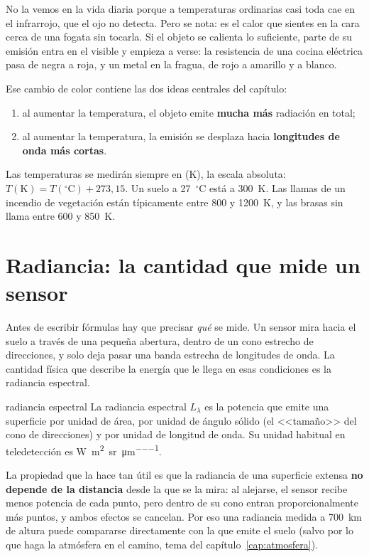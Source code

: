 No la vemos en la vida diaria porque a temperaturas ordinarias casi toda cae en el infrarrojo,
que el ojo no detecta. Pero se nota: es el calor que sientes en la cara cerca de una fogata sin
tocarla. Si el objeto se calienta lo suficiente, parte de su emisión entra en el visible y
empieza a verse: la resistencia de una cocina eléctrica pasa de negra a roja, y un metal en la
fragua, de rojo a amarillo y a blanco.

Ese cambio de color contiene las dos ideas centrales del capítulo:

\begin{enumerate}
  \item al aumentar la temperatura, el objeto emite \textbf{mucha más} radiación en total;
  \item al aumentar la temperatura, la emisión se desplaza hacia \textbf{longitudes de onda más
  cortas}.
\end{enumerate}

Las temperaturas se medirán siempre en  (K), la escala absoluta: $T(\mathrm{K})
= T(^\circ\mathrm{C}) + 273{,}15$. Un suelo a 27~$^\circ$C está a 300~K. Las llamas de un
incendio de vegetación están típicamente entre 800 y 1200~K, y las brasas sin llama entre 600 y
850~K.

\section{Radiancia: la cantidad que mide un sensor}

Antes de escribir fórmulas hay que precisar \emph{qué} se mide. Un sensor mira hacia el suelo a
través de una pequeña abertura, dentro de un cono estrecho de direcciones, y solo deja pasar una
banda estrecha de longitudes de onda. La cantidad física que describe la energía que le llega en
esas condiciones es la radiancia espectral.

\begin{definicion}{radiancia espectral}
La radiancia espectral $L_\lambda$ es la potencia que emite una superficie por unidad de área,
por unidad de ángulo sólido (el <<tamaño>> del cono de direcciones) y por unidad de longitud de
onda. Su unidad habitual en teledetección es
\si{\watt\per\square\metre\per\steradian\per\micro\metre}.
\end{definicion}

La propiedad que la hace tan útil es que la radiancia de una superficie extensa \textbf{no
depende de la distancia} desde la que se la mira: al alejarse, el sensor recibe menos potencia
de cada punto, pero dentro de su cono entran proporcionalmente más puntos, y ambos efectos se
cancelan. Por eso una radiancia medida a 700~km de altura puede compararse directamente con la
que emite el suelo (salvo por lo que haga la atmósfera en el camino, tema del
capítulo~\ref{cap:atmosfera}).

